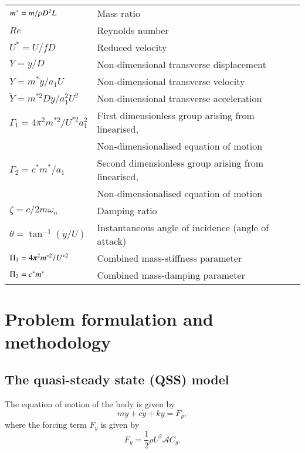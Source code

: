 \begin{longtable}{p{}p{}}
$m^{*}=m/\rho D^2L$ & Mass ratio \\
$Re$ & Reynolds number  \\
$U^*=U/fD$ & Reduced velocity  \\
$Y=y/D$ & Non-dimensional transverse displacement \\
$\dot{Y}=m^*\dot{y}/a_1U$ & Non-dimensional transverse velocity \\
$\ddot{Y}=m^{*2}D\ddot{y}/a_1^2U^2$ & Non-dimensional transverse acceleration \\
$\Gamma_1 = 4\pi^2m^{*2}/U^{*2}a_1^2$ & First dimensionless group arising from linearised,\\ 
& Non-dimensionalised equation of motion\\
$\Gamma_2 = c^*m^*/a_1$ & Second dimensionless group arising from linearised,\\
& Non-dimensionalised equation of motion \\
$\zeta= c/2 m \omega_n$ & Damping ratio \\
$\theta= \tan^{-1}{(\dot{y}/U)}$ & Instantaneous angle of incidence (angle of attack)\\
$\Pi_1 =  4\pi^2m^{*2}/U^{*2}$ & Combined mass-stiffness parameter\\
$\Pi_2 = c^*m^*$ & Combined mass-damping parameter\\
\end{longtable}  



\section{Problem formulation and methodology}
\label{sec:theory}

\subsection{The quasi-steady state (QSS) model}

The equation of motion of the body is given by 
\begin{equation}
\label{equationofmotion}
m\ddot{y}+c\dot{y}+ky=F_y,
\end{equation}
where the forcing term $F_y$ is given by
\begin{equation}
\label{lift equation}
F_y=\frac{1}{2}\rho U^2\mathcal{A}C_y.
\end{equation}


